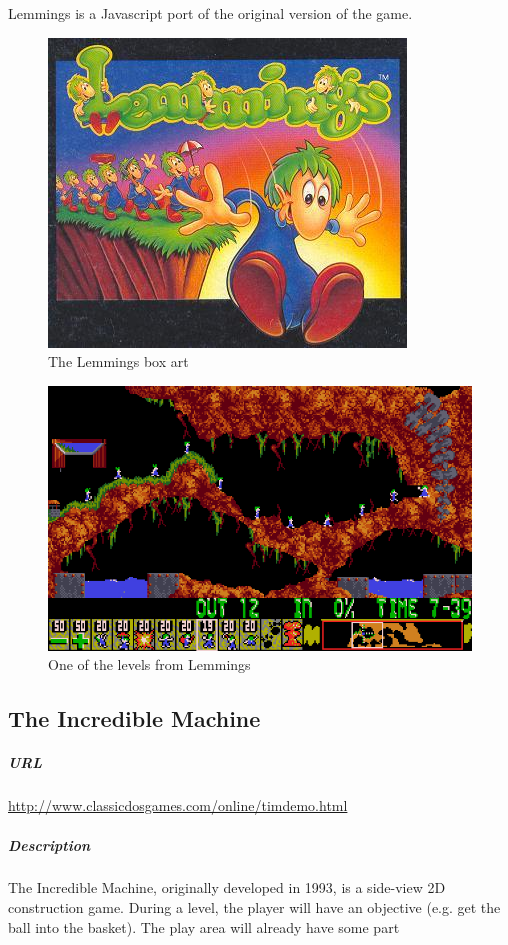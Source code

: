 Lemmings is a Javascript port of the original version of the game.\newpage\begin{figure}[h!]\centering \includegraphics[height=0.33\textheight]{img/lemmings_title.jpg}\caption{The Lemmings box art}\end{figure}\begin{figure}[h!]\centering \includegraphics[height=0.33\textheight]{img/lemmings_screen.jpg}\caption{One of the levels from Lemmings}\end{figure}\subsection{The Incredible Machine}\subparagraph{URL}\url{http://www.classicdosgames.com/online/timdemo.html}\subparagraph{Description}The Incredible Machine, originally developed in 1993, is a side-view 2D construction game. During a level, the player will have an objective (e.g. get the ball into the basket). The play area will already have some part